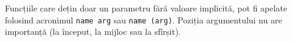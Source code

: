 Funcțiile care dețin doar un parametru fără valoare implicită, pot fi apelate folosind acronimul \texttt{name arg} sau \texttt{name (arg)}. Poziția argumentului nu are importanță (la început, la mijloc sau la sfîrșit).

\begin{listing}
\label{callfunc}
\inputminted[linenos]{icl}{../sources/callfunc.icL}
\end{listing}

\begin{listing}
\label{defaultparametrs}
\inputminted[linenos]{icl}{../sources/defaultparametrs.icL}
\end{listing}


